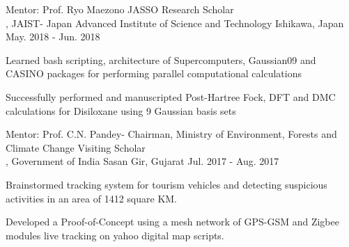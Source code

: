 \begin{cventries}
\cventry
    {Mentor: Prof. Ryo Maezono} %
    {JASSO Research Scholar \\, JAIST- Japan Advanced Institute of Science and Technology} %
    {Ishikawa, Japan} %
    {May. 2018 - Jun. 2018} %
    {
      \begin{cvitems} %
        \item {Learned bash scripting, architecture of Supercomputers, Gaussian09 and CASINO packages for performing parallel computational calculations}
        \item {Successfully performed and manuscripted Post-Hartree Fock, DFT and DMC calculations for Disiloxane using 9 Gaussian basis sets}
      \end{cvitems}
    }
\cventry
    {Mentor: Prof. C.N. Pandey- Chairman, Ministry of Environment, Forests and Climate Change} %
    {Visiting Scholar \\, Government of India} %
    {Sasan Gir, Gujarat} %
    {Jul. 2017 - Aug. 2017} %
    {
      \begin{cvitems} %
        \item {Brainstormed} tracking system for tourism vehicles and detecting suspicious activities in an area of 1412 square KM.
        \item {Developed} a Proof-of-Concept using a mesh network of GPS-GSM and Zigbee modules live tracking on yahoo digital map scripts.
      \end{cvitems}
    }
\end{cventries}


